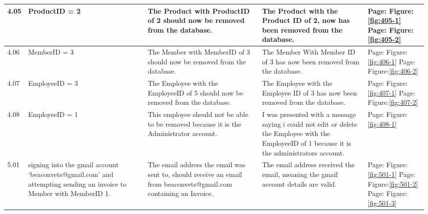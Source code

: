 \begin{flushleft}
\begin{longtable}{|p{1.0cm}|p{2.5cm}|p{3cm}|p{3.0cm}|p{2.5cm}|}
	4.05 & ProductID = 2 & The Product with ProductID of 2 should now be removed from the database.& The Product with the Product ID of 2, now has been removed from the database.& Page:\pageref{fig:405-1}  \newline Figure:\ref{fig:405-1} \newline \newline  Page:\pageref{fig:405-2}  \newline Figure:\ref{fig:405-2}\\ \hline
	4.06 & MemberID = 3 & The Member with MemberID of 3 should now be removed from the database.& The Member With Member ID of 3 has now been removed from the database.& Page:\pageref{fig:406-1}  \newline Figure:\ref{fig:406-1} \newline \newline  Page:\pageref{fig:406-2}  \newline Figure:\ref{fig:406-2}\\ \hline
	4.07 & EmployeeID = 3 & The Employee with the EmployeeID of 5 should now be removed from the database. & The Employee with the Employee ID of 3 has now been removed from the database.& Page:\pageref{fig:407-1}  \newline Figure:\ref{fig:407-1} \newline \newline  Page:\pageref{fig:407-2}  \newline Figure:\ref{fig:407-2} \\ \hline
	4.08 &  EmployeeID = 1 & This employee should not be able to be removed because it is the Administrator account.& I was presented with a message saying i could not edit or delete the Employee with the EmployeeID of 1 because it is the administrators account. &  Page:\pageref{fig:408-1}  \newline Figure:\ref{fig:408-1}\\ \hline
	5.01 &  signing into the gmail account `beaconvets@gmail.com' and attempting sending an invoice to Member with MemberID 1.  & The email address the email was sent to, should receive an email from beaconvets@gmail.com containing an Invoice. & The email address received the email, meaning the gmail account details are valid. & Page:\pageref{fig:501-1}  \newline Figure:\ref{fig:501-1} \newline \newline  Page:\pageref{fig:501-2}  \newline Figure:\ref{fig:501-2}  \newline \newline  Page:\pageref{fig:501-3}  \newline Figure:\ref{fig:501-3}\\ \hline

\end{longtable}
\end{flushleft}
